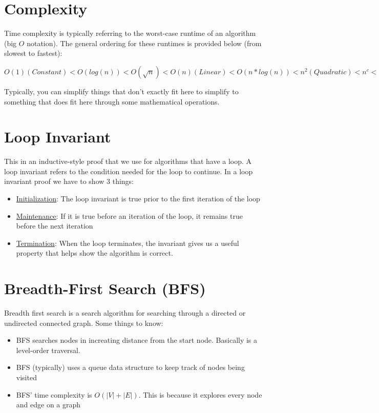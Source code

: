 \documentclass{article}
\begin{document}
\section{Complexity}
Time complexity is typically referring to the worst-case runtime of an algorithm (big $O$ notation). The general ordering for these runtimes is provided below (from slowest to fastest):

$O(1) (Constant) < O(log(n)) < O(\sqrt{n}) < O(n) (Linear) < O(n*log(n)) < n^2 (Quadratic) < n^c < 2^n (Exponential) < c^n < n! (Factorial) < n^n$

Typically, you can simplify things that don't exactly fit here to simplify to something that does fit here through some mathematical operations. 

\section{Loop Invariant}
This in an inductive-style proof that we use for algorithms that have a loop. A loop invariant refers to the condition needed for the loop to continue. In a loop invariant proof we have to show 3 things:
\begin{itemize}
    \item \underline{Initialization}: The loop invariant is true prior to the first iteration of the loop
    \item \underline{Maintenance}: If it is true before an iteration of the loop, it remains true before the next iteration
    \item \underline{Termination}: When the loop terminates, the invariant gives us a useful property that helps show the algorithm is correct.
\end{itemize}

\section{Breadth-First Search (BFS)}
Breadth first search is a search algorithm for searching through a directed or undirected connected graph. Some things to know:

\begin{itemize}
    \item BFS searches nodes in increating distance from the start node. Basically is a level-order traversal.
    \item BFS (typically) uses a queue data structure to keep track of nodes being visited
    \item BFS' time complexity is $O(|V|+|E|)$. This is because it explores every node and edge on a graph
\end{itemize}
\end{document}
